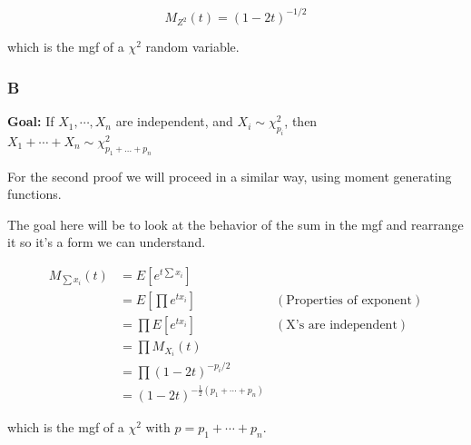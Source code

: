 \[M_{Z^2}(t) = (1-2t)^{-1/2}\]

which is the mgf of a $\chi^2$ random variable.

\subsubsection*{B}

\noindent\textbf{Goal:} If $X_1, \cdots, X_n$ are independent, and $X_i \sim \chi^2_{p_i}$, then $X_1 + \cdots + X_n \sim \chi^2_{p_1 + \ldots + p_n}$

For the second proof we will proceed in a similar way, using moment generating functions.

The goal here will be to look at the behavior of the sum in the mgf and rearrange it so it's a form we can understand.

\begin{align*}
	M_{\sum x_i}(t) &= E[e^{t \sum x_i}] \\
	&= E\left[\prod e^{t x_i} \right] & (\text{Properties of exponent}) \\
	&= \prod E[e^{tx_i}] & (\text{X's are independent}) \\
	&= \prod M_{X_{i}} (t) \\
	&= \prod (1-2t)^{-p_i/2} \\
	&= (1-2t)^{-\frac{1}{2} (p_1 + \cdots + p_n)}
\end{align*}


which is the mgf of a $\chi^2$ with $p=p_1 + \cdots + p_n$.
